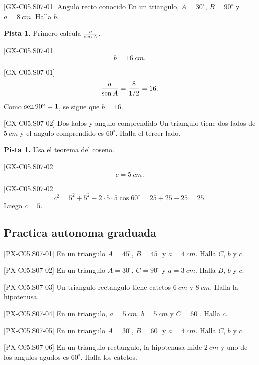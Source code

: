 \begin{guidedexercise}{[GX-C05.S07-01] Angulo recto conocido}
En un triangulo, \(A=30^\circ\), \(B=90^\circ\) y \(a=\SI{8}{cm}\). Halla \(b\).

\textbf{Pista 1.} Primero calcula \(\frac{a}{\operatorname{sen} A}\).
\end{guidedexercise}

\begin{shortanswer}{[GX-C05.S07-01]}
\[
b=\SI{16}{cm}.
\]
\end{shortanswer}

\begin{fullsolution}{[GX-C05.S07-01]}
\[
\frac{a}{\operatorname{sen} A}=\frac{8}{1/2}=16.
\]
Como \(\operatorname{sen} 90^\circ=1\), se sigue que \(b=16\).
\end{fullsolution}

\begin{guidedexercise}{[GX-C05.S07-02] Dos lados y angulo comprendido}
Un triangulo tiene dos lados de \(\SI{5}{cm}\) y el angulo comprendido es \(60^\circ\). Halla
el tercer lado.

\textbf{Pista 1.} Usa el teorema del coseno.
\end{guidedexercise}

\begin{shortanswer}{[GX-C05.S07-02]}
\[
c=\SI{5}{cm}.
\]
\end{shortanswer}

\begin{fullsolution}{[GX-C05.S07-02]}
\[
c^2=5^2+5^2-2\cdot 5\cdot 5\cos 60^\circ=25+25-25=25.
\]
Luego \(c=5\).
\end{fullsolution}

\subsection*{Practica autonoma graduada}
\begin{exercise}{[PX-C05.S07-01] En un triangulo \(A=45^\circ\), \(B=45^\circ\) y \(a=\SI{4}{cm}\). Halla \(C\), \(b\) y \(c\).}
\end{exercise}
\begin{exercise}{[PX-C05.S07-02] En un triangulo \(A=30^\circ\), \(C=90^\circ\) y \(a=\SI{3}{cm}\). Halla \(B\), \(b\) y \(c\).}
\end{exercise}
\begin{exercise}{[PX-C05.S07-03] Un triangulo rectangulo tiene catetos \(\SI{6}{cm}\) y \(\SI{8}{cm}\). Halla la hipotenusa.}
\end{exercise}
\begin{exercise}{[PX-C05.S07-04] En un triangulo, \(a=\SI{5}{cm}\), \(b=\SI{5}{cm}\) y \(C=60^\circ\). Halla \(c\).}
\end{exercise}
\begin{exercise}{[PX-C05.S07-05] En un triangulo \(A=30^\circ\), \(B=60^\circ\) y \(a=\SI{4}{cm}\). Halla \(C\), \(b\) y \(c\).}
\end{exercise}
\begin{exercise}{[PX-C05.S07-06] En un triangulo rectangulo, la hipotenusa mide \(\SI{2}{cm}\) y uno de los angulos agudos es \(60^\circ\). Halla los catetos.}
\end{exercise}

